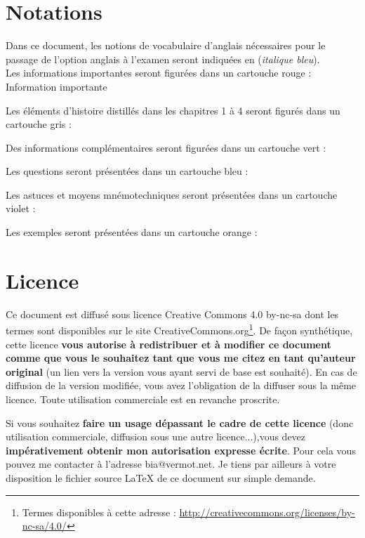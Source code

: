\documentclass[a4paper,12pt,oneside]{report} %
\newcommand{\anglais}[1]{(\textit{\color{blue}#1})}
\begin{document}
	
	
	\section{Notations}
	Dans ce document, les notions de vocabulaire d'anglais nécessaires pour le passage de l'option anglais à l'examen seront indiquées en \anglais{italique bleu}. \\
	
	Les informations importantes seront figurées dans un cartouche rouge : \nobreak\\
	\alert{Information importante}
	
	Les éléments d'histoire distillés dans les chapitres 1 à 4 seront figurés dans un cartouche gris :\nobreak\\
	
	Des informations complémentaires seront figurées dans un cartouche vert : \nobreak\\
	
	Les questions seront présentées dans un cartouche bleu :  \nobreak\\
	
	Les astuces et moyens mnémotechniques seront présentées dans un cartouche violet :  \nobreak\\
	
	Les exemples seront présentées dans un cartouche orange :  \nobreak\\

	\section{Licence}
	Ce document est diffusé sous licence Creative Commons 4.0 by-nc-sa dont les termes sont disponibles sur le site CreativeCommons.org\footnote{Termes disponibles à cette adresse : \url{http://creativecommons.org/licenses/by-nc-sa/4.0/}}. De façon synthétique, cette licence \textbf{vous autorise à redistribuer et à modifier ce document comme que vous le souhaitez tant que vous me citez en tant qu'auteur original} (un lien vers la version vous ayant servi de base est souhaité). En cas de diffusion de la version modifiée, vous avez l'obligation de la diffuser sous la même licence. Toute utilisation commerciale est en revanche proscrite. 
	
	Si vous souhaitez \textbf{faire un usage dépassant le cadre de cette licence} (donc utilisation commerciale, diffusion sous une autre licence...),vous devez \textbf{impérativement obtenir mon autorisation expresse écrite}. Pour cela vous pouvez me contacter à l'adresse bia@vermot.net. Je tiens par ailleurs à votre disposition le fichier source \LaTeX{} de ce document sur simple demande.
\end{document}
